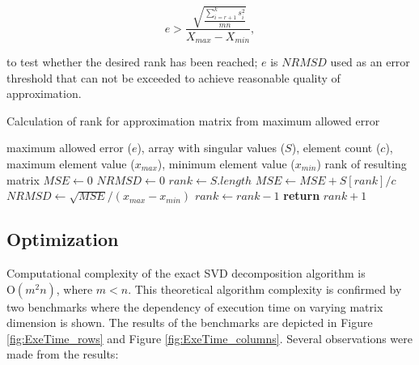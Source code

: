 \begin{equation}
e > \frac{\sqrt[]{\frac{\sum_{i=r+1}^{k} s_{i}^{2}}{m n}}}{X_{max}-X_{min}},
\end{equation}

\noindent
to test whether the desired rank has been reached; $e$ is $\mathit{NRMSD}$ used as an error threshold that can not be exceeded to achieve reasonable quality of approximation.

\begin{algorithm}
  \caption{Calculation of rank for approximation matrix from maximum allowed error}\label{rankAlgorithm}
  \label{alg:rank-calculation}
  \begin{algorithmic}[1]
  	\INPUT maximum allowed error ($e$), array with singular values ($S$), element count ($c$), maximum element value ($x_{max}$), minimum element value ($x_{min}$)
    \OUTPUT rank of resulting matrix
      \State $\mathit{MSE} \gets 0$
      \State $\mathit{NRMSD} \gets 0$
      \State $rank \gets S.length$
        \State $\mathit{MSE} \gets \mathit{MSE} + S[rank]/c$ 
        \State $\mathit{NRMSD} \gets \sqrt{\mathit{MSE}} / (x_{max} - x_{min})$ 
        \State $rank \gets rank - 1$ 
      \EndWhile
      \State \textbf{return} $rank + 1$ 
    \EndProcedure
  \end{algorithmic}
\end{algorithm}


\subsection{Optimization}


Computational complexity of the exact SVD decomposition algorithm is $\mathrm{O}(m^2n)$, where $m<n$. This theoretical algorithm complexity is confirmed by two benchmarks where the dependency of execution time on varying matrix dimension is shown. The results of the benchmarks are depicted in Figure \ref{fig:ExeTime_rows} and Figure \ref{fig:ExeTime_columns}. Several observations were made from the results:

